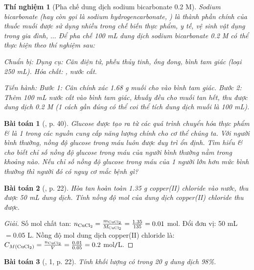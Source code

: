 \documentclass{article}
\newtheorem{baitoan}{Bài toán}
\newtheorem{thinghiem}{Thí nghiệm}
\begin{document}
\begin{thinghiem}[Pha chế dung dịch sodium bicarbonate 0.2 M]
	Sodium bicarbonate (hay còn gọi là sodium hydrogencarbonate, ) là thành phần chính của thuốc muối được sử dụng nhiều trong chế biến thực phẩm, y tế, vệ sinh vật dụng trong gia đình, $\ldots$ Để pha chế 100 mL dung dịch sodium bicarbonate 0.2 M có thể thực hiện theo thí nghiệm sau:
	
	\emph{Chuẩn bị:} Dụng cụ: Cân điện tử, phễu thủy tinh, ống đong, bình tam giác (loại \emph{250 mL}). Hóa chất: \emph{}, nước cất.
	
	\emph{Tiến hành:} Bước 1: Cân chính xác \emph{1.68 g} muối \emph{} cho vào bình tam giác. Bước 2: Thêm \emph{100 mL} nước cất vào bình tam giác, khuấy đều cho muối tan hết, thu được dung dịch \emph{ 0.2 M} (1 cách gần đúng có thể coi thể tích dung dịch muối  là \emph{100 mL}).
\end{thinghiem}

\begin{baitoan}[\cite{SGK_KHTN_8_Canh_Dieu}, p. 40]
	Glucose được tạo ra từ các quá trình chuyển hóa thực phẩm \& là 1 trong các nguồn cung cấp năng lượng chính cho cơ thể chúng ta. Với người bình thường, nồng độ glucose trong máu luôn được duy trì ổn định. Tìm hiểu \& cho biết chỉ số nồng độ glucose trong máu của người bình thường nằm trong khoảng nào. Nếu chỉ số nồng độ glucose trong máu của 1 người lớn hơn mức bình thường thì người đó có nguy cơ mắc bệnh gì?
\end{baitoan}

\begin{baitoan}[\cite{SGK_KHTN_8_KNTTVCS}, p. 22]
	Hòa tan hoàn toàn \emph{1.35 g} copper(II) chloride vào nước, thu được \emph{50 mL} dung dịch. Tính nồng độ mol của dung dịch copper(II) chloride thu được.
\end{baitoan}

\begin{proof}[Giải]
	Số mol chất tan: $n_{\ce{CuCl2}} = \frac{m_{\ce{CuCl2}}}{M_{\ce{CuCl2}}} = \frac{1.35}{135} = 0.01$ mol. Đổi đơn vị: 50 mL $= 0.05$ L. Nồng độ mol dung dịch copper(II) chloride là: $C_{M(\ce{CuCl2})} = \frac{n_{\ce{CuCl2}}}{V} = \frac{0.01}{0.05} = 0.2$ mol\texttt{/}L.
\end{proof}

\begin{baitoan}[\cite{SGK_KHTN_8_KNTTVCS}, 1, p. 22]
	Tính khối lượng \emph{} có trong \emph{20 g} dung dịch \emph{ 98\%}.
\end{baitoan}
\end{document}
